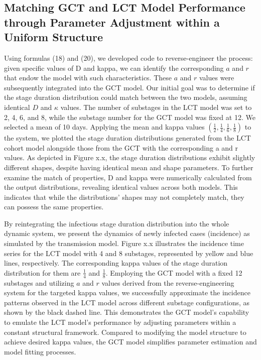 \documentclass[12pt]{article}
\begin{document}
\subsection{Matching GCT and LCT Model Performance through Parameter Adjustment within a Uniform Structure}

Using formulas (18) and (20), we developed code to reverse-engineer the process: given specific values of D and kappa, we can identify the corresponding $a$ and $r$ that endow the model with such characteristics. These $a$ and $r$ values were subsequently integrated into the GCT model. Our initial goal was to determine if the stage duration distribution could match between the two models, assuming identical $D$ and $\kappa$ values. The number of substages in the LCT model was set to 2, 4, 6, and 8, while the substage number for the GCT model was fixed at 12. We selected a mean of 10 days. Applying the mean and kappa values $\left( \frac{1}{2}, \frac{1}{4}, \frac{1}{6}, \frac{1}{8} \right)$ to the system, we plotted the stage duration distributions generated from the LCT cohort model alongside those from the GCT with the corresponding a and r values. As depicted in Figure x.x, the stage duration distributions exhibit slightly different shapes, despite having identical mean and shape parameters. To further examine the match of properties, D and kappa were numerically calculated from the output distributions, revealing identical values across both models. This indicates that while the distributions' shapes may not completely match, they can possess the same properties.

By reintegrating the infectious stage duration distribution into the whole dynamic system, we present the dynamics of newly infected cases (incidence) as simulated by the transmission model. Figure x.x illustrates the incidence time series for the LCT model with 4 and 8 substages, represented by yellow and blue lines, respectively. The corresponding kappa values of the stage duration distribution for them are $\frac{1}{4}$ and $\frac{1}{8}$. Employing the GCT model with a fixed 12 substages and utilizing $a$ and $r$ values derived from the reverse-engineering system for the targeted kappa values, we successfully approximate the incidence patterns observed in the LCT model across different substage configurations, as shown by the black dashed line. This demonstrates the GCT model's capability to emulate the LCT model's performance by adjusting parameters within a constant structural framework. Compared to modifying the model structure to achieve desired kappa values, the GCT model simplifies parameter estimation and model fitting processes. 
\end{document}

